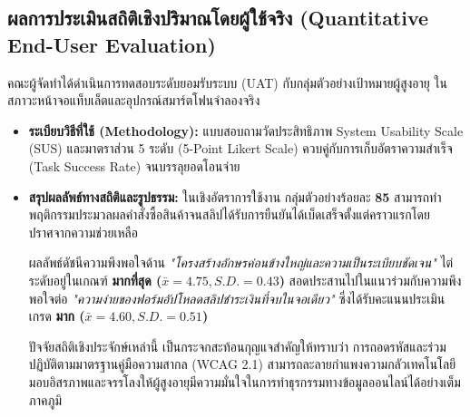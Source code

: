 \subsection{ผลการประเมินสถิติเชิงปริมาณโดยผู้ใช้จริง (Quantitative End-User Evaluation)}
คณะผู้จัดทำได้ดำเนินการทดสอบระดับยอมรับระบบ (UAT) กับกลุ่มตัวอย่างเป้าหมายผู้สูงอายุ ในสภาวะหน้าจอแท็บเล็ตและอุปกรณ์สมาร์ตโฟนจำลองจริง
\begin{itemize}
    \item \textbf{ระเบียบวิธีที่ใช้ (Methodology):} แบบสอบถามวัดประสิทธิภาพ System Usability Scale (SUS) และมาตราส่วน 5 ระดับ (5-Point Likert Scale) ควบคู่กับการเก็บอัตราความสำเร็จ (Task Success Rate) จนบรรลุยอดโอนจ่าย
    \item \textbf{สรุปผลลัพธ์ทางสถิติและรูปธรรม:} 
    ในเชิงอัตราการใช้งาน กลุ่มตัวอย่างร้อยละ \textbf{85} สามารถทำพฤติกรรมประมวลผลคำสั่งซื้อสินค้าจนสลิปได้รับการยืนยันได้เบ็ดเสร็จตั้งแต่คราวแรกโดยปราศจากความช่วยเหลือ
    
    ผลลัพธ์ดัชนีความพึงพอใจด้าน \textit{"โครงสร้างอักษรค่อนข้างใหญ่และความเป็นระเบียบชัดเจน"} ไต่ระดับอยู่ในเกณฑ์ \textbf{มากที่สุด ($\bar{x} = 4.75, S.D. = 0.43$)} สอดประสานไปในแนวร่วมกับความพึงพอใจต่อ \textit{"ความง่ายของฟอร์มอัปโหลดสลิปชำระเงินที่จบในจอเดียว"} ซึ่งได้รับคะแนนประเมินเกรด \textbf{มาก ($\bar{x} = 4.60, S.D. = 0.51$)} 
    
    ปัจจัยสถิติเชิงประจักษ์เหล่านี้ เป็นกระจกสะท้อนกุญแจสำคัญให้ทราบว่า การถอดรหัสและร่วมปฏิบัติตามมาตรฐานคู่มือความสากล (WCAG 2.1) สามารถละลายกำแพงความกลัวเทคโนโลยี มอบอิสรภาพและจรรโลงให้ผู้สูงอายุมีความมั่นใจในการทำธุรกรรมทางข้อมูลออนไลน์ได้อย่างเต็มภาคภูมิ
\end{itemize}
